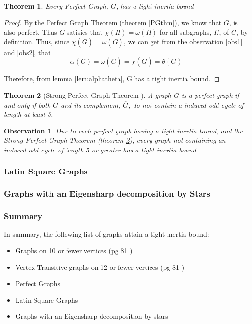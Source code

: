 \documentclass[12pt]{article}
\theoremstyle{parenbold}
\newtheorem{observation}{Observation}[section]
\newtheorem{theorem}{Theorem}[section]
\begin{document}
\begin{theorem}
Every Perfect Graph, $G$, has a tight inertia bound
\end{theorem}

\begin{proof}
By the Perfect Graph Theorem (theorem \ref{PGthm}), we know that $\overline{G}$, is also perfect. Thus $\overline{G}$ satisies that $\chi(H) = \omega(H)$ for all subgraphs, $H$, of $\overline{G}$, by definition.
Thus, since $\chi(\overline{G}) = \omega(\overline{G})$, we can get from the observation \ref{obs1} and \ref{obs2}, that
\begin{equation}
\alpha(G) = \omega(\overline{G}) = \chi(\overline{G}) = \theta(G)
\end{equation}

Therefore, from lemma \ref{lem:alphatheta}, G has a tight inertia bound.
\end{proof}

\begin{theorem}[Strong Perfect Graph Theorem \cite{elzinga2007minimum}] \label{SPGT}
A graph $G$ is a perfect graph if and only if both $G$ and its complement, $\overline{G}$, do not contain a induced odd cycle of length at least 5.
\end{theorem}

\begin{observation}
Due to each perfect graph having a tight inertia bound, and the Strong Perfect Graph Theorem (theorem \ref{SPGT}), every graph not containing an induced odd cycle of length 5 or greater has a tight inertia bound.
\end{observation}

\subsubsection{Latin Square Graphs}

\subsubsection{Graphs with an Eigensharp decomposition by Stars}

\subsubsection{Summary}
In summary, the following list of graphs attain a tight inertia bound:
\begin{itemize}
	\item Graphs on 10 or fewer vertices (pg 81 \cite{elzinga2007minimum})
	\item Vertex Transitive graphs on 12 or fewer vertices (pg 81 \cite{elzinga2007minimum})
	\item Perfect Graphs
	\item Latin Square Graphs
	\item Graphs with an Eigensharp decomposition by stars
\end{itemize}
\end{document}

